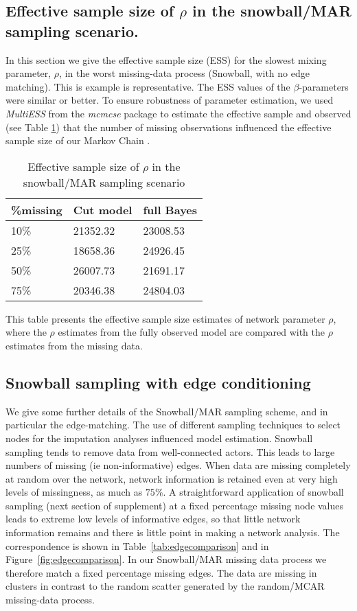 \documentclass{article}
\begin{document}
\newpage
\subsection{Effective sample size of $\rho$ in the snowball/MAR sampling scenario.}\label{sec:ESS}

In this section we give the effective sample size (ESS) for the slowest mixing parameter, $\rho$, in the worst missing-data process (Snowball, with no edge matching). 
This is example is representative. The ESS values of the $\beta$-parameters were similar or better. To ensure robustness of parameter estimation, we used \textit{MultiESS} from the \textit{mcmcse} package to estimate the effective sample and observed (see Table \ref{tab:ESS}) that the number of missing observations influenced the effective sample size of our Markov Chain \cite{vats2015multivariate}.

\begin{table}[ht]
	\centering
	\caption{Effective sample size of $\rho$ in the snowball/MAR sampling scenario}
	\label{tab:ESS}
	\begin{tabular}{lll}
		\%missing	& Cut model	& full Bayes\\ \hline
		10\% 		& 21352.32  & 23008.53  \\
		25\%		& 18658.36 	& 24926.45  \\
		50\%		& 26007.73  & 21691.17 	\\
		75\% 		& 20346.38  & 24804.03 \\ \hline
	\end{tabular}
	
	\raggedright This table presents the effective sample size estimates of network parameter $\rho$, {\color{blue}where the $\rho$ estimates from the fully observed model are compared with the $\rho$ estimates from the missing data.}
\end{table}

\subsection{Snowball sampling with edge conditioning}\label{sec:supsnowballnotes}

We give some further details of the Snowball/MAR sampling scheme, and in particular the edge-matching. The use of different sampling techniques to select nodes for the imputation analyses influenced model estimation. Snowball sampling tends to remove data from well-connected actors. This leads to large numbers of missing (ie non-informative) edges. When data are missing completely at random over the network, network information is retained even at very high levels of missingness, as much as $75\%$. A straightforward application of snowball sampling (next section of supplement) at a fixed percentage missing node values leads to extreme low levels of informative edges, so that little network information remains and there is
little point in making a network analysis. The correspondence is shown in Table~\ref{tab:edgecomparison} and in Figure~\ref{fig:edgecomparison}. In our Snowball/MAR missing data process we therefore match a fixed percentage missing edges. The data are missing in clusters in contrast to the random scatter generated by the random/MCAR missing-data process.
\end{document}
